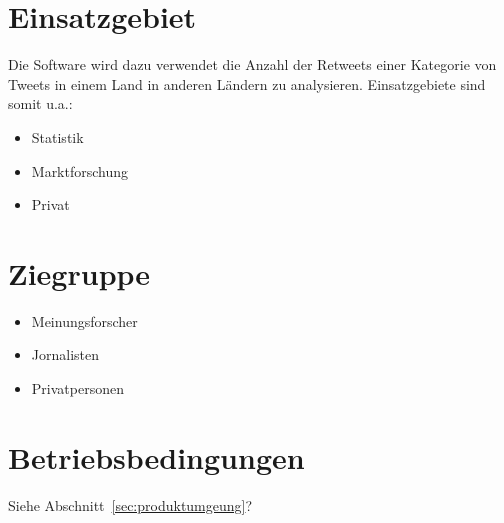 \section{Einsatzgebiet}
Die Software wird dazu verwendet die Anzahl der Retweets einer Kategorie von Tweets in einem Land in anderen Ländern zu analysieren. Einsatzgebiete sind somit u.a.:
\begin{itemize}[noitemsep,topsep=0.5em]
	\item Statistik
	\item Marktforschung
	\item Privat
\end{itemize}
\section{Ziegruppe}
\begin{itemize}[noitemsep,topsep=0.5em]
	\item Meinungsforscher
	\item Jornalisten
	\item Privatpersonen
\end{itemize}
\section{Betriebsbedingungen}
Siehe  Abschnitt~\ref{sec:produktumgeung}?
